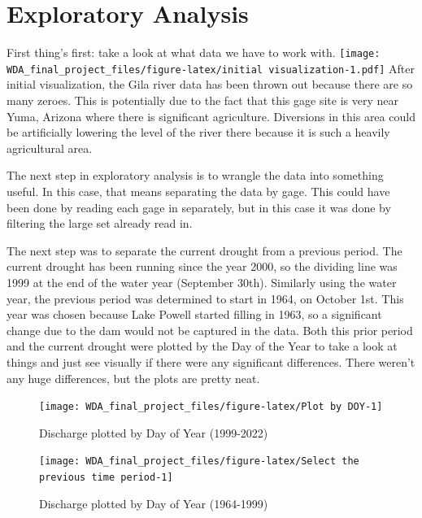 \documentclass[
  12pt,
]{article}
\begin{document}
\hypertarget{exploratory-analysis}{%
\section{Exploratory Analysis}\label{exploratory-analysis}}

First thing's first: take a look at what data we have to work with.
\texttt{[image: WDA\_final\_project\_files/figure-latex/initial visualization-1.pdf]}
After initial visualization, the Gila river data has been thrown out
because there are so many zeroes. This is potentially due to the fact
that this gage site is very near Yuma, Arizona where there is
significant agriculture. Diversions in this area could be artificially
lowering the level of the river there because it is such a heavily
agricultural area.

The next step in exploratory analysis is to wrangle the data into
something useful. In this case, that means separating the data by gage.
This could have been done by reading each gage in separately, but in
this case it was done by filtering the large set already read in.

The next step was to separate the current drought from a previous
period. The current drought has been running since the year 2000, so the
dividing line was 1999 at the end of the water year (September 30th).
Similarly using the water year, the previous period was determined to
start in 1964, on October 1st. This year was chosen because Lake Powell
started filling in 1963, so a significant change due to the dam would
not be captured in the data. Both this prior period and the current
drought were plotted by the Day of the Year to take a look at things and
just see visually if there were any significant differences. There
weren't any huge differences, but the plots are pretty neat.

\begin{figure}

\texttt{[image: WDA\_final\_project\_files/figure-latex/Plot by DOY-1]} \hfill{}

\caption{Discharge plotted by Day of Year (1999-2022)}\label{fig:Plot by DOY}
\end{figure}

\begin{figure}

\texttt{[image: WDA\_final\_project\_files/figure-latex/Select the previous time period-1]} \hfill{}

\caption{Discharge plotted by Day of Year (1964-1999)}\label{fig:Select the previous time period}
\end{figure}
\end{document}
